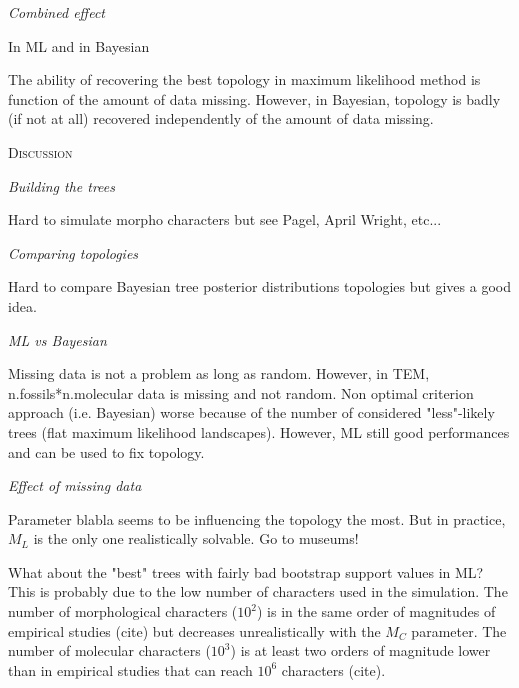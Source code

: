 \documentclass[12pt,letterpaper]{article}
\renewcommand{\section}[1]{%
\bigskip
\begin{center}
\begin{Large}
\normalfont\scshape #1
\medskip
\end{Large}
\end{center}}
\renewcommand{\subsection}[1]{%
\bigskip
\begin{center}
\begin{large}
\normalfont\itshape #1
\end{large}
\end{center}}
\begin{document}
\subsection{Combined effect}
In ML and in Bayesian

The ability of recovering the best topology in maximum likelihood method is function of the amount of data missing.
However, in Bayesian, topology is badly (if not at all) recovered independently of the amount of data missing.

\section{Discussion}

\subsection{Building the trees}
Hard to simulate morpho characters but see Pagel, April Wright, etc...

\subsection{Comparing topologies}
Hard to compare Bayesian tree posterior distributions topologies but gives a good idea.

\subsection{ML vs Bayesian}
Missing data is not a problem as long as random. However, in TEM, n.fossils*n.molecular data is missing and not random.
Non optimal criterion approach (i.e. Bayesian) worse because of the number of considered "less"-likely trees (flat maximum likelihood landscapes).
However, ML still good performances and can be used to fix topology.

\subsection{Effect of missing data}
Parameter blabla seems to be influencing the topology the most.
But in practice, $M_L$ is the only one realistically solvable. Go to museums!

What about the "best" trees with fairly bad bootstrap support values in ML?
This is probably due to the low number of characters used in the simulation.
The number of morphological characters ($10^2$) is in the same order of magnitudes of empirical studies (cite) but decreases unrealistically with the $M_C$ parameter. %
The number of molecular characters ($10^3$) is at least two orders of magnitude lower than in empirical studies that can reach $10^6$ characters (cite).
\end{document}
